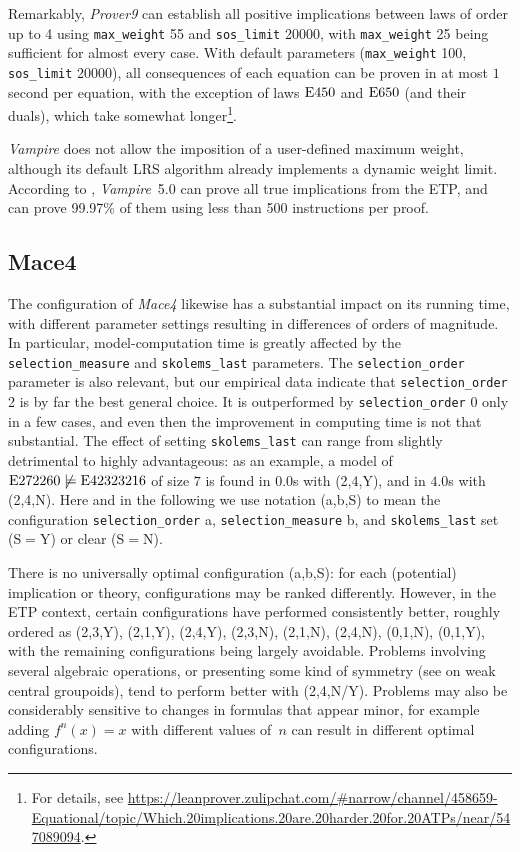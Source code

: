 Remarkably, \emph{Prover9} can establish all positive implications between laws of order up to 4 using \verb|max_weight| 55 and \verb|sos_limit| 20000, with \verb|max_weight| 25 being sufficient for almost every case. With default parameters (\verb|max_weight| 100, \verb|sos_limit| 20000), all consequences of each equation can be proven in at most $1$ second per equation, with the exception of laws $\mathrm{E}450$ and $\mathrm{E}650$ (and their duals), which take somewhat longer\footnote{For details, see \url{https://leanprover.zulipchat.com/\#narrow/channel/458659-Equational/topic/Which.20implications.20are.20harder.20for.20ATPs/near/547089094}.}.

\emph{Vampire} does not allow the imposition of a user-defined maximum weight, although its default LRS algorithm already implements a dynamic weight limit. According to \cite{janota2025experimentalresultsvampireequational}, \emph{Vampire}~5.0 can prove all true implications from the ETP, and can prove 99.97\% of them using less than 500 instructions per proof.

\subsection{Mace4}\label{Mace4}

The configuration of \emph{Mace4} likewise has a substantial impact on its running time, with different parameter settings resulting in differences of orders of magnitude. In particular, model-computation time is greatly affected by the \verb|selection_measure| and \verb|skolems_last| parameters. The \verb|selection_order| parameter is also relevant, but our empirical data indicate that \verb|selection_order| 2 is by far the best general choice. It is outperformed by \verb|selection_order| 0 only in a few cases, and even then the improvement in computing time is not that substantial. The effect of setting \verb|skolems_last| can range from slightly detrimental to highly advantageous: as an example, a model of $\mathrm{E}272260\not\models\mathrm{E}42323216$ of size $7$ is found in $0.0$s with (2,4,Y), and in $4.0$s with (2,4,N). Here and in the following we use notation (a,b,S) to mean the configuration \verb|selection_order| a, \verb|selection_measure| b, and \verb|skolems_last| set (S$=$Y) or clear (S$=$N).

There is no universally optimal configuration (a,b,S): for each (potential) implication or theory, configurations may be ranked differently. However, in the ETP context, certain configurations have performed consistently better, roughly ordered as (2,3,Y), (2,1,Y), (2,4,Y), (2,3,N), (2,1,N), (2,4,N), (0,1,N), (0,1,Y), with the remaining configurations being largely avoidable. Problems involving several algebraic operations, or presenting some kind of symmetry (see  on weak central groupoids), tend to perform better with (2,4,N/Y). Problems may also be considerably sensitive to changes in formulas that appear minor, for example adding $f^n(x)=x$ with different values of~$n$ can result in different optimal configurations.

